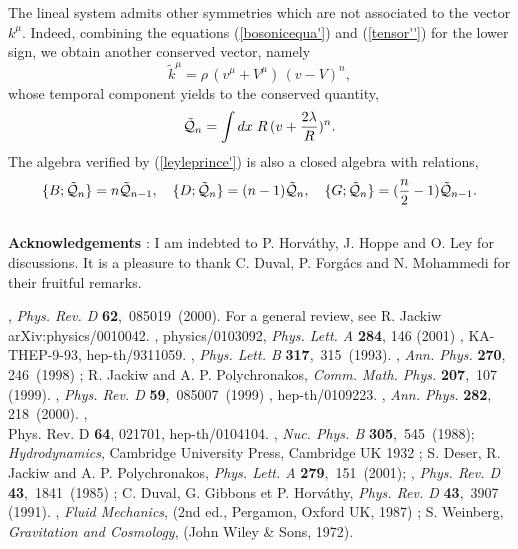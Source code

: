 \documentclass[11pt,a4paper]{article}
\begin{document}
The lineal system admits other symmetries which are not associated to the vector $k^\mu$. Indeed, combining the equations (\ref{bosonicequa'}) and (\ref{tensor''}) for the lower sign, we obtain another conserved vector, namely
$$
\tilde{k}^\mu=\rho\,(v^\mu+V^\mu)\,(v-V)^n,
$$
whose temporal component yields to the conserved quantity,
\begin{eqnarray}
\tilde{{\cal Q}}_{n}=\int dx\;R\,(v+\frac{2\lambda}{R})^n.
\label{leyleprince'}
\end{eqnarray}
The algebra verified by (\ref{leyleprince'}) is also a closed algebra with relations,
\begin{eqnarray*}
\{B;\tilde{{\cal Q}}_{n}\}=n \tilde{{\cal Q}}_{n-1},\quad \{D;\tilde{{\cal Q}}_{n}\}=(n-1) \tilde{{\cal Q}}_{n},\quad \{G;\tilde{{\cal Q}}_{n}\}=(\frac{n}{2}-1)\tilde{{\cal Q}}_{n-1}.
\end{eqnarray*}
\\
\noindent
{\bf Acknowledgements} : I am indebted to P. Horv\'athy, J. Hoppe and O. Ley for discussions. It is a pleasure to thank C. Duval, P. Forg\'acs and N. Mohammedi for their fruitful remarks.










\begin{thebibliography}{2}
, {\em Phys. Rev. D} {\bf 62},\, 085019\, (2000). For a general review, see {\sc R. Jackiw} arXiv:physics/0010042. 
, physics/0103092, {\em
Phys. Lett. A} {\bf 284}, 146 (2001)
, KA-THEP-9-93, hep-th/9311059.
, {\em Phys. Lett. B} {\bf 317},\, 315\, (1993).
,
{\em Ann. Phys.} {\bf 270},\, 246\, (1998) ; {\sc R. Jackiw and A. P. Polychronakos}, {\em
Comm. Math. Phys.} {\bf 207},\, 107\,(1999).
, {\em Phys. Rev. D} {\bf 59},\, 085007\, (1999) 
, hep-th/0109223.
, {\em
Ann.
Phys.} {\bf 282},\, 218\, (2000).
, \\
Phys. Rev. D {\bf 64}, 021701, hep-th/0104104.
, {\em Nuc. Phys. B} {\bf 305},\, 545\, (1988); 
 {\it Hydrodynamics}, Cambridge University Press, Cambridge UK 1932 ; {\sc S. Deser, R. Jackiw and A. P. Polychronakos}, {\em Phys. Lett. A} {\bf 279},\, 151\, (2001); 
, {\em Phys. Rev. D} {\bf 43},\, 1841\, (1985) ; {\sc C. Duval, G. Gibbons et P. Horv\'athy}, {\em Phys. Rev. D} {\bf 43},\, 3907\, (1991).
, {\em Fluid Mechanics}, (2nd ed., Pergamon, Oxford UK, 1987) ; {\sc S. Weinberg}, {\em Gravitation and Cosmology}, (John Wiley \& Sons, 1972).


\end{thebibliography}
\end{document}
